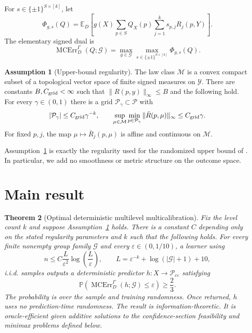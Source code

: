 \documentclass{article}
\newtheorem{theorem}{Theorem}
\theoremstyle{definition}
\newtheorem{assumption}[theorem]{Assumption}
\theoremstyle{remark}
\newcommand{\E}{\mathbb E}
\newcommand{\Prb}{\mathbb P}
\newcommand{\1}{\mathbf 1}
\newcommand{\cG}{\mathcal G}
\newcommand{\cM}{\mathcal M}
\newcommand{\cP}{\mathcal P}
\newcommand{\MCE}{\operatorname{MCErr}}
\begin{document}
For $s\in\{\pm1\}^{S\times[k]}$, let
\[
\Phi_{g,s}(Q)=\E_D\!\left[g(X)\sum_{p\in S}Q_X(p)\sum_{j=1}^k s_{p,j}R_j(p,Y)\right].
\]
The elementary signed dual is
\begin{equation}
\MCE_D^\Gamma(Q;\cG)=\max_{g\in\cG}\max_{s\in\{\pm1\}^{S\times[k]}}\Phi_{g,s}(Q).
\label{eq:signed}
\end{equation}

\begin{assumption}[Upper-bound regularity]\label{ass:regularity}
The law class $\cM$ is a convex compact subset of a topological vector space of finite signed measures on $\mathcal Y$. There are constants $B,C_{\rm grid}<\infty$ such that $\|R(p,y)\|_\infty\le B$ and the following hold. For every $\gamma\in(0,1)$ there is a grid $\cP_\gamma\subset\cP$ with
\[
|\cP_\gamma|\le C_{\rm grid}\gamma^{-k},\qquad
\sup_{\mu\in\cM}\min_{p\in\cP_\gamma}\|\bar R(p,\mu)\|_\infty\le C_{\rm grid}\gamma.
\]
For fixed $p,j$, the map $\mu\mapsto\bar R_j(p,\mu)$ is affine and continuous on $\cM$.
\end{assumption}

Assumption~\ref{ass:regularity} is exactly the regularity used for the randomized upper bound of \citet{lu2026multilevel}. In particular, we add no smoothness or metric structure on the outcome space.

\section{Main result}

\begin{theorem}[Optimal deterministic multilevel multicalibration]\label{thm:main}
Fix the level count $k$ and suppose Assumption~\ref{ass:regularity} holds. There is a constant $C$ depending only on the stated regularity parameters and $k$ such that the following holds. For every finite nonempty group family $\cG$ and every $\varepsilon\in(0,1/10)$, a learner using
\begin{equation}
n\le C\frac{L}{\varepsilon^2}\log\!\left(\frac{L}{\varepsilon}\right),
\qquad
L=\varepsilon^{-k}+\log(|\cG|+1)+10,
\label{eq:mainrate}
\end{equation}
i.i.d. samples outputs a deterministic predictor $h:X\to\cP_{c\varepsilon}$ satisfying
\[
\Prb\!\left(\MCE_D^\Gamma(h;\cG)\le\varepsilon\right)\ge\frac23.
\]
The probability is over the sample and training randomness. Once returned, $h$ uses no prediction-time randomness. The result is information-theoretic. It is oracle-efficient given additive solutions to the confidence-section feasibility and minimax problems defined below.
\end{theorem}
\end{document}

